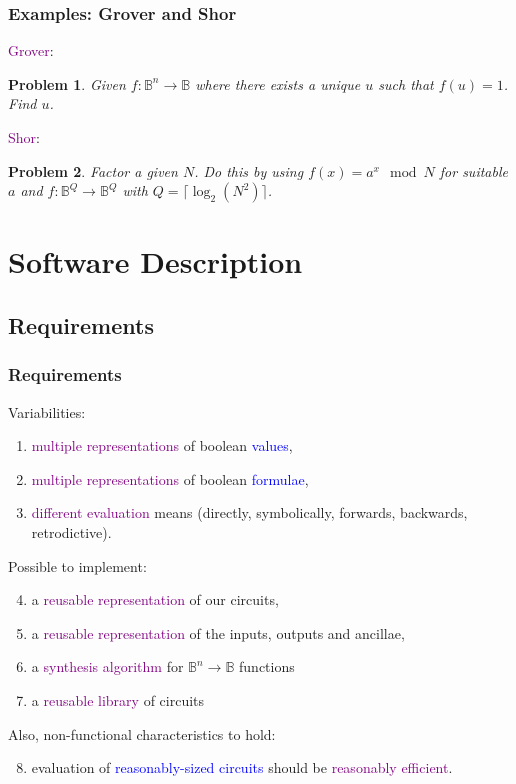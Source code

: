 \documentclass{beamer}
\newcommand{\Bool}{\ensuremath{\mathbb{B}}}
\newtheorem{prob}{Problem}
\newcommand{\pub}[1]{\textcolor{purple}{#1}}
\newcommand{\blu}[1]{\textcolor{blue}{#1}}
\begin{document}
\begin{frame}
  \frametitle{Examples: Grover and Shor}
  \pub{Grover}:
\begin{prob}
    Given $f : \Bool^n\rightarrow\Bool$ where there exists a unique $u$
    such that $f(u)=1$. Find $u$.
\end{prob}

  \vspace*{8mm}
  \pub{Shor}:
\begin{prob}
  Factor a given $N$. Do this by using $f(x) = a^x \mod N$ for suitable $a$ and
  $f : \Bool^Q \rightarrow \Bool^Q$ with $Q = \lceil \log_2 \left(N^2\right) \rceil$.
\end{prob}

\end{frame}


\section[Software]{Software Description}
\subsection[Requirements]{Requirements}
\begin{frame}
  \frametitle{Requirements}
  Variabilities:
\begin{enumerate}
  \item \pub{multiple representations} of boolean \blu{values},
  \item \pub{multiple representations} of boolean \blu{formulae}, 
  \item \pub{different evaluation} means (directly, symbolically, forwards,
    backwards, retrodictive).
\end{enumerate}

\noindent Possible to implement:
\begin{enumerate}
    \setcounter{enumi}{3}
  \item a \pub{reusable representation} of our circuits,
  \item a \pub{reusable representation} of the inputs, outputs and ancillae,
  \item a \pub{synthesis algorithm} for $\Bool^n\rightarrow\Bool$ functions
  \item a \pub{reusable library} of circuits
\end{enumerate}

Also, non-functional characteristics to hold:
\begin{enumerate}
    \setcounter{enumi}{7}
  \item evaluation of \blu{reasonably-sized circuits} should be 
    \pub{reasonably efficient}.
\end{enumerate}

\end{frame}
\end{document}
